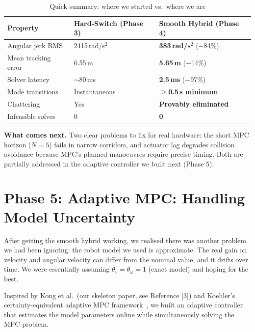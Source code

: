 \documentclass[12pt,a4paper]{article}
\begin{document}
\begin{table}[H]
\centering
\caption{Quick summary: where we started vs.\ where we are}
\begin{tabular}{lll}
\toprule
\textbf{Property} & \textbf{Hard-Switch (Phase 3)} & \textbf{Smooth Hybrid (Phase 4)} \\
\midrule
Angular jerk RMS     & 2415\,rad/s$^2$ & \textbf{383\,rad/s$^2$} ($-$84\%) \\
Mean tracking error  & 6.55\,m         & \textbf{5.65\,m} ($-$14\%) \\
Solver latency       & $\sim$80\,ms    & \textbf{2.5\,ms} ($-$97\%) \\
Mode transitions     & Instantaneous   & \textbf{$\geq$0.5\,s minimum} \\
Chattering           & Yes             & \textbf{Provably eliminated} \\
Infeasible solves    & 0               & \textbf{0} \\
\bottomrule
\end{tabular}
\end{table}

\noindent\textbf{What comes next.} Two clear problems to fix for real hardware: the short MPC horizon ($N=5$) fails in narrow corridors, and actuator lag degrades collision avoidance because MPC's planned manoeuvres require precise timing. Both are partially addressed in the adaptive controller we built next (Phase 5).

\section{Phase 5: Adaptive MPC: Handling Model Uncertainty}

After getting the smooth hybrid working, we realised there was another problem we had been ignoring: the robot model we used is approximate. The real gain on velocity and angular velocity can differ from the nominal value, and it drifts over time. We were essentially assuming $\theta_v = \theta_\omega = 1$ (exact model) and hoping for the best.

Inspired by Kong et al.\ (our skeleton paper, see Reference [3]) and Koehler's certainty-equivalent adaptive MPC framework~\cite{koehler2025}, we built an adaptive controller that estimates the model parameters online while simultaneously solving the MPC problem.
\end{document}
